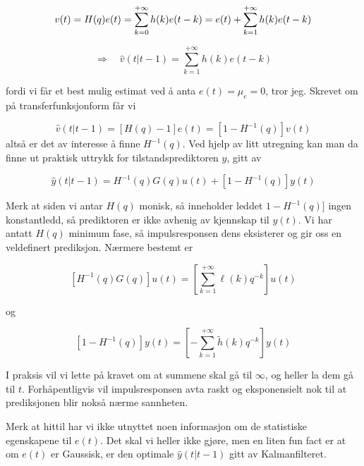\begin{equation}
v(t)=H(q) e(t)=\sum_{k=0}^{+\infty} h(k) e(t-k)=e(t)+\sum_{k=1}^{+\infty} h(k) e(t-k) \\
\end{equation}

\begin{equation}
\Longrightarrow \quad \widehat{v}(t | t-1)=\sum_{k=1}^{+\infty} h(k) e(t-k)
\end{equation}

fordi vi får et best mulig estimat ved å anta $e(t) = \mu_e = 0$, tror jeg. Skrevet om på transferfunksjonform får vi

\begin{equation}
	\hat{v}(t | t-1) = [H(q) - 1] e(t) = [1 - H^{-1}(q)] v(t)
\end{equation}
altså er det av interesse å finne $H^{-1}(q)$. Ved hjelp av litt utregning kan man da finne ut praktisk uttrykk for tilstandsprediktoren $\hat{y}$, gitt av

\begin{equation}
	\hat{y}(t | t-1) = H^{-1}(q) G(q) u(t) + [1 - H^{-1}(q)] y(t)
	\label{eq:predictor}
\end{equation}

Merk at siden vi antar $H(q)$ monisk, så inneholder leddet $1 - H^{-1}(q)]$ ingen konstantledd, så prediktoren er ikke avhenig av kjennskap til $y(t)$. Vi har antatt $H(q)$ minimum fase, så impulsresponsen dens eksisterer og gir oss en veldefinert prediksjon. Nærmere bestemt er

\begin{equation}
	\left[H^{-1}(q) G(q)\right] u(t)=\left[\sum_{k=1}^{+\infty} \ell(k) q^{-k}\right] u(t)
\end{equation}

og

\begin{equation}
	\left[1-H^{-1}(q)\right] y(t)=\left[-\sum_{k=1}^{+\infty} \widetilde{h}(k) q^{-k}\right] y(t)
\end{equation}

I praksis vil vi lette på kravet om at summene skal gå til $\infty$, og heller la dem gå til $t$. Forhåpentligvis vil impulsresponsen avta raskt og eksponensielt nok til at prediksjonen blir nokså nærme sannheten.

Merk at hittil har vi ikke utnyttet noen informasjon om de statistiske egenskapene til $e(t)$. Det skal vi heller ikke gjøre, men en liten fun fact er at om $e(t)$ er Gaussisk, er den optimale $\hat{y}(t | t-1)$ gitt av Kalmanfilteret.

